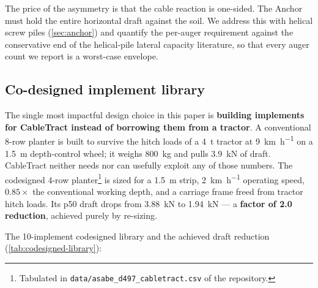 \documentclass[11pt,a4paper]{article}
\begin{document}
The price of the asymmetry is that the cable reaction is one-sided. The Anchor must hold the entire horizontal draft against the soil. We address this with helical screw piles (\cref{sec:anchor}) and quantify the per-auger requirement against the conservative end of the helical-pile lateral capacity literature, so that every auger count we report is a worst-case envelope.

\subsection{Co-designed implement library}\label{sec:codesign}

The single most impactful design choice in this paper is \textbf{building implements for CableTract instead of borrowing them from a tractor}. A conventional 8-row planter is built to survive the hitch loads of a \SI{4}{\tonne} tractor at \SI{9}{\kilo\meter\per\hour} on a \SI{1.5}{\meter} depth-control wheel; it weighs \SI{800}{\kilogram} and pulls \SI{3.9}{\kilo\newton} of draft. CableTract neither needs nor can usefully exploit any of those numbers. The codesigned 4-row planter\footnote{Tabulated in \texttt{data/asabe\_d497\_cabletract.csv} of the repository.} is sized for a \SI{1.5}{\meter} strip, \SI{2}{\kilo\meter\per\hour} operating speed, $0.85\times$ the conventional working depth, and a carriage frame freed from tractor hitch loads. Its \gls{p50} draft drops from \SI{3.88}{\kilo\newton} to \SI{1.94}{\kilo\newton} --- a \textbf{factor of 2.0 reduction}, achieved purely by re-sizing.

The 10-implement codesigned library and the achieved draft reduction (\cref{tab:codesigned-library}):
\end{document}
